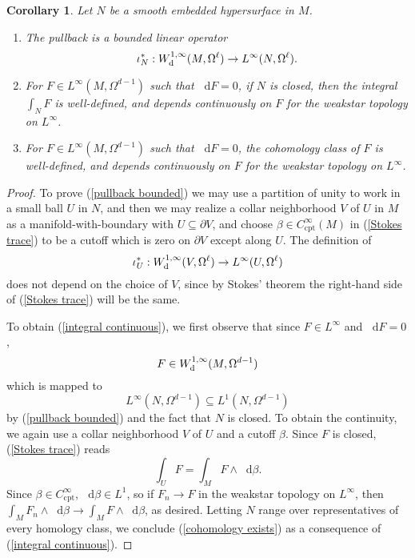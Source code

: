 \documentclass[reqno,11pt]{amsart}
\newcommand*\dif{\mathop{}\!\mathrm{d}}
\newcommand{\cpt}{\mathrm{cpt}}
\newtheorem{corollary}[theorem]{Corollary}
\theoremstyle{definition}
\numberwithin{equation}{section}
\begin{document}
\begin{corollary}\label{trace on cycles}
Let $N$ be a smooth embedded hypersurface in $M$.
\begin{enumerate}
\item \label{pullback bounded} The pullback is a bounded linear operator
$$\iota^*_N: W^{1, \infty}_{\rm d}(M, \Omega^\ell) \to L^\infty(N, \Omega^\ell).$$
\item \label{integral continuous} For $F \in L^\infty(M, \Omega^{d - 1})$ such that $\dif F = 0$, if $N$ is closed, then the integral $\int_N F$ is well-defined, and depends continuously on $F$ for the weakstar topology on $L^\infty$.
\item \label{cohomology exists} For $F \in L^\infty(M, \Omega^{d - 1})$ such that $\dif F = 0$, the cohomology class of $F$ is well-defined, and depends  continuously on $F$ for the weakstar topology on $L^\infty$.
\end{enumerate}
\end{corollary}
\begin{proof}
To prove (\ref{pullback bounded}) we may use a partition of unity to work in a small ball $U$ in $N$, and then we may realize a collar neighborhood $V$ of $U$ in $M$ as a manifold-with-boundary with $U \subseteq \partial V$, and choose $\beta \in C^\infty_\cpt(M)$ in (\ref{Stokes trace}) to be a cutoff which is zero on $\partial V$ except along $U$.
The definition of
$$\iota^*_U: W^{1, \infty}_{\rm d}(V, \Omega^\ell) \to L^\infty(U, \Omega^\ell)$$
does not depend on the choice of $V$, since by Stokes' theorem the right-hand side of (\ref{Stokes trace}) will be the same.

To obtain (\ref{integral continuous}), we first observe that since $F \in L^\infty$ and $\dif F = 0$,
$$F \in W^{1, \infty}_{\rm d}(M, \Omega^{d - 1})$$
which is mapped to
$$L^\infty(N, \Omega^{d - 1}) \subseteq L^1(N, \Omega^{d - 1})$$
by (\ref{pullback bounded}) and the fact that $N$ is closed.
To obtain the continuity, we again use a collar neighborhood $V$ of $U$ and a cutoff $\beta$.
Since $F$ is closed, (\ref{Stokes trace}) reads 
$$\int_U F = \int_M F \wedge \dif \beta.$$
Since $\beta \in C^\infty_\cpt$, $\dif \beta \in L^1$, so if $F_n \to F$ in the weakstar topology on $L^\infty$, then $\int_M F_n \wedge \dif \beta \to \int_M F \wedge \dif \beta$, as desired.
Letting $N$ range over representatives of every homology class, we conclude (\ref{cohomology exists}) as a consequence of (\ref{integral continuous}).
\end{proof}
\end{document}
